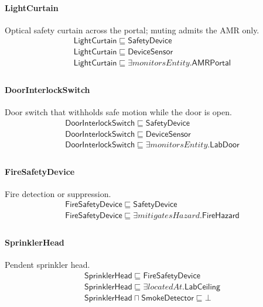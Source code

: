 \documentclass[10pt]{article}
\begin{document}
\paragraph{LightCurtain} Optical safety curtain across the portal; muting admits the AMR only.
\[\begin{array}{l}
\mathsf{LightCurtain} \sqsubseteq  \mathsf{SafetyDevice} \\
\mathsf{LightCurtain} \sqsubseteq  \mathsf{DeviceSensor} \\
\mathsf{LightCurtain} \sqsubseteq  \exists \mathit{monitorsEntity}.\mathsf{AMRPortal} \\
\end{array}\]
\paragraph{DoorInterlockSwitch} Door switch that withholds safe motion while the door is open.
\[\begin{array}{l}
\mathsf{DoorInterlockSwitch} \sqsubseteq  \mathsf{SafetyDevice} \\
\mathsf{DoorInterlockSwitch} \sqsubseteq  \mathsf{DeviceSensor} \\
\mathsf{DoorInterlockSwitch} \sqsubseteq  \exists \mathit{monitorsEntity}.\mathsf{LabDoor} \\
\end{array}\]
\paragraph{FireSafetyDevice} Fire detection or suppression.
\[\begin{array}{l}
\mathsf{FireSafetyDevice} \sqsubseteq  \mathsf{SafetyDevice} \\
\mathsf{FireSafetyDevice} \sqsubseteq  \exists \mathit{mitigatesHazard}.\mathsf{FireHazard} \\
\end{array}\]
\paragraph{SprinklerHead} Pendent sprinkler head.
\[\begin{array}{l}
\mathsf{SprinklerHead} \sqsubseteq  \mathsf{FireSafetyDevice} \\
\mathsf{SprinklerHead} \sqsubseteq  \exists \mathit{locatedAt}.\mathsf{LabCeiling} \\
\mathsf{SprinklerHead} \sqcap  \mathsf{SmokeDetector} \sqsubseteq  \bot  \\
\end{array}\]
\end{document}
